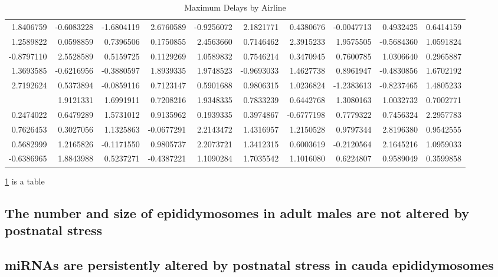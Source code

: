 \documentclass[12pt,twoside]{reedthesis}
\begin{document}
\begin{longtable}[t]{rrrrrrrrrr}
\caption[Max Delays by Airline]{\label{tab:tab1}Maximum Delays by Airline}\\
\toprule
1.8406759 & -0.6083228 & -1.6804119 & 2.6760589 & -0.9256072 & 2.1821771 & 0.4380676 & -0.0047713 & 0.4932425 & 0.6414159\\
1.2589822 & 0.0598859 & 0.7396506 & 0.1750855 & 2.4563660 & 0.7146462 & 2.3915233 & 1.9575505 & -0.5684360 & 1.0591824\\
-0.8797110 & 2.5528589 & 0.5159725 & 0.1129269 & 1.0589832 & 0.7546214 & 0.3470945 & 0.7600785 & 1.0306640 & 0.2965887\\
1.3693585 & -0.6216956 & -0.3880597 & 1.8939335 & 1.9748523 & -0.9693033 & 1.4627738 & 0.8961947 & -0.4830856 & 1.6702192\\
2.7192624 & 0.5373894 & -0.0859116 & 0.7123147 & 0.5901688 & 0.9806315 & 1.0236824 & -1.2383613 & -0.8237465 & 1.4805233\\
\addlinespace
2.0850612 & 1.9121331 & 1.6991911 & 0.7208216 & 1.9348335 & 0.7833239 & 0.6442768 & 1.3080163 & 1.0032732 & 0.7002771\\
0.2474022 & 0.6479289 & 1.5731012 & 0.9135962 & 0.1939335 & 0.3974867 & -0.6777198 & 0.7779322 & 0.7456324 & 2.2957783\\
0.7626453 & 0.3027056 & 1.1325863 & -0.0677291 & 2.2143472 & 1.4316957 & 1.2150528 & 0.9797344 & 2.8196380 & 0.9542555\\
0.5682999 & 1.2165826 & -0.1171550 & 0.9805737 & 2.2073721 & 1.3412315 & 0.6003619 & -0.2120564 & 2.1645216 & 1.0959033\\
-0.6386965 & 1.8843988 & 0.5237271 & -0.4387221 & 1.1090284 & 1.7035542 & 1.1016080 & 0.6224807 & 0.9589049 & 0.3599858\\
\bottomrule
\end{longtable}
\ref{tab:tab1} is a table

\hypertarget{the-number-and-size-of-epididymosomes-in-adult-males-are-not-altered-by-postnatal-stress}{%
\subsection{The number and size of epididymosomes in adult males are not altered by postnatal stress}\label{the-number-and-size-of-epididymosomes-in-adult-males-are-not-altered-by-postnatal-stress}}

\hypertarget{mirnas-are-persistently-altered-by-postnatal-stress-in-cauda-epididymosomes}{%
\subsection{miRNAs are persistently altered by postnatal stress in cauda epididymosomes}\label{mirnas-are-persistently-altered-by-postnatal-stress-in-cauda-epididymosomes}}
\end{document}
